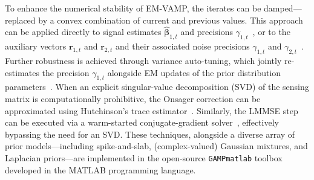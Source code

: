 To enhance the numerical stability of EM-VAMP, the iterates can be damped—replaced by a convex combination of current and previous values. This approach can be applied directly to signal estimates $\hat{\bm{\beta}}_{1,t}$ and precisions $\gamma_{1,t}$~\cite{rangan_vector_2019}, or to the auxiliary vectors $\bm{r}_{1,t}$ and $\bm{r}_{2,t}$ and their associated noise precisions $\gamma_{1,t}$ and $\gamma_{2,t}$~\cite{VAMP_MRI,sarkar2021mri}. Further robustness is achieved through variance auto-tuning, which jointly re-estimates the precision $\gamma_{1,t}$ alongside EM updates of the prior distribution parameters~\cite{RigorousDynamics2017}. When an explicit singular-value decomposition (SVD) of the sensing matrix is computationally prohibitive, the Onsager correction can be approximated using Hutchinson's trace estimator~\cite{schniter2021gampmatlab}. Similarly, the LMMSE step can be executed via a warm-started conjugate-gradient solver~\cite{schniter2021gampmatlab, skuratovs2022warmstarting}, effectively bypassing the need for an SVD. These techniques, alongside a diverse array of prior models—including spike-and-slab, (complex-valued) Gaussian mixtures, and Laplacian priors—are implemented in the open-source \texttt{GAMPmatlab} toolbox~\cite{schniter2021gampmatlab} developed in the MATLAB programming language.

